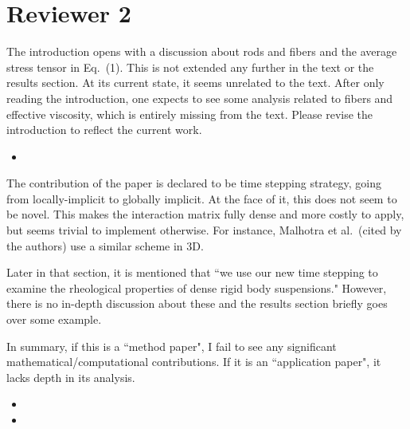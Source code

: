 \documentclass[11pt]{article}
\newcommand{\comment}[1]{{\color{blue} #1}}
\begin{document}
\section*{Reviewer 2}
\noindent
\comment{The introduction opens with a discussion about rods and fibers
  and the average stress tensor in Eq.~(1). This is not extended any
  further in the text or the results section. At its current state, it
  seems unrelated to the text. After only reading the introduction, one
  expects to see some analysis related to fibers and effective
viscosity, which is entirely missing from the text. Please revise the
introduction to reflect the current work.}
\begin{itemize}
  \item {}
\end{itemize}


\noindent
\comment{The contribution of the paper is declared to be time stepping
  strategy, going from locally-implicit to globally implicit. At the
  face of it, this does not seem to be novel. This makes the interaction
  matrix fully dense and more costly to apply, but seems trivial to
  implement otherwise. For instance, Malhotra et al.~(cited by the
authors) use a similar scheme in 3D.

Later in that section, it is mentioned that ``we use our new time
stepping to examine the rheological properties of dense rigid body
suspensions." However, there is no in-depth discussion about these and
the results section briefly goes over some example.

In summary, if this is a ``method paper", I fail to see any significant
mathematical/computational contributions. If it is an ``application
paper", it lacks depth in its analysis.}
\begin{itemize}
  \item {}
  \item {}
\end{itemize}
\end{document}
